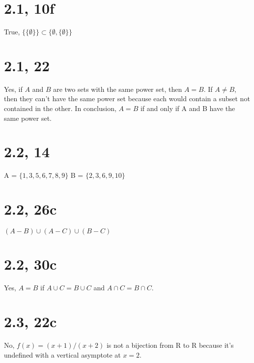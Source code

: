 \documentclass{article}
\title{Discrete Math: Problem Set #2}
\author{Jackie Luo}
\date{February 25, 2015}
\begin{document}
\maketitle

\section{2.1, 10f}
True, $\{\{\emptyset\}\} \subset \{\emptyset, \{\emptyset\}\}$

\section{2.1, 22}
Yes, if $A$ and $B$ are two sets with the same power set, then $A = B$. If $A \neq B$, then they can't have the same power set because each would contain a subset not contained in the other. In conclusion, $A = B$ if and only if A and B have the same power set.

\section{2.2, 14}
A = $\{1, 3, 5, 6, 7, 8, 9\}$
\newline
B = $\{2, 3, 6, 9, 10\}$

\section{2.2, 26c}
$(A - B) \cup (A - C) \cup (B - C)$
\newline
\begin{center}
\def\firstcircle{(90:1.75cm) circle (2.5cm)}
\def\secondcircle{(210:1.75cm) circle (2.5cm)}
\def\thirdcircle{(330:1.75cm) circle (2.5cm)}
\end{center}

\section{2.2, 30c}
Yes, $A = B$ if $A \cup C = B \cup C$ and $A \cap C = B \cap C$.

\section{2.3, 22c}
No, $f(x) = (x + 1)/(x + 2)$ is not a bijection from R to R because it's undefined with a vertical asymptote at $x = 2$.
\end{document}
